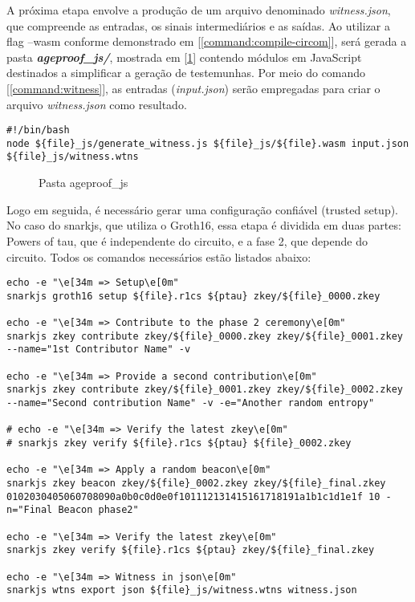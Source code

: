 A próxima etapa envolve a produção de um arquivo denominado \textit{witness.json}, que compreende as entradas, os sinais intermediários e as saídas. Ao utilizar a flag --wasm conforme demonstrado em [\ref{command:compile-circom}], será gerada a pasta \textbf{\textit{ageproof\_js/}}, mostrada em [\ref{fig:organização-ageproof}] contendo módulos em JavaScript destinados a simplificar a geração de testemunhas. Por meio do comando [\ref{command:witness}], as entradas (\textit{input.json}) serão empregadas para criar o arquivo \textit{witness.json} como resultado.

\begin{lstlisting}[style=shell, caption={Comando de geração witness.wtns}, label=command:witness]
#!/bin/bash
node ${file}_js/generate_witness.js ${file}_js/${file}.wasm input.json ${file}_js/witness.wtns
\end{lstlisting}

\begin{figure}[h]
    \centering
    \begin{minipage}{.2\textwidth}
    \end{minipage}
    \caption{Pasta ageproof\_js}
    \label{fig:organização-ageproof}
\end{figure}

Logo em seguida, é necessário gerar uma configuração confiável (trusted setup). No caso do snarkjs, que utiliza o Groth16, essa etapa é dividida em duas partes: Powers of tau, que é independente do circuito, e a fase 2, que depende do circuito. Todos os comandos necessários estão listados abaixo:

\begin{lstlisting}[style=shell, caption={Comando para configuração confiável}, label=command-trusted-setup]
echo -e "\e[34m => Setup\e[0m"
snarkjs groth16 setup ${file}.r1cs ${ptau} zkey/${file}_0000.zkey

echo -e "\e[34m => Contribute to the phase 2 ceremony\e[0m"
snarkjs zkey contribute zkey/${file}_0000.zkey zkey/${file}_0001.zkey --name="1st Contributor Name" -v

echo -e "\e[34m => Provide a second contribution\e[0m"
snarkjs zkey contribute zkey/${file}_0001.zkey zkey/${file}_0002.zkey --name="Second contribution Name" -v -e="Another random entropy"

# echo -e "\e[34m => Verify the latest zkey\e[0m"
# snarkjs zkey verify ${file}.r1cs ${ptau} ${file}_0002.zkey

echo -e "\e[34m => Apply a random beacon\e[0m"
snarkjs zkey beacon zkey/${file}_0002.zkey zkey/${file}_final.zkey 0102030405060708090a0b0c0d0e0f101112131415161718191a1b1c1d1e1f 10 -n="Final Beacon phase2"

echo -e "\e[34m => Verify the latest zkey\e[0m"
snarkjs zkey verify ${file}.r1cs ${ptau} zkey/${file}_final.zkey

echo -e "\e[34m => Witness in json\e[0m"
snarkjs wtns export json ${file}_js/witness.wtns witness.json
\end{lstlisting}

